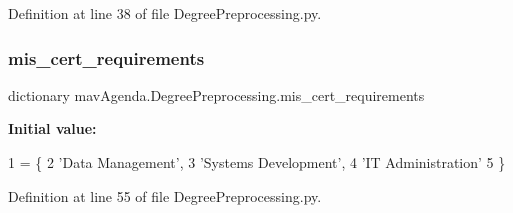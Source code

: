 Definition at line 38 of file Degree\+Preprocessing.\+py.

\mbox{\label{namespacemavAgenda_1_1DegreePreprocessing_a0dc9af5c79d9e5db222b8eb43ea009ce}} 
\subsubsection{\texorpdfstring{mis\+\_\+cert\+\_\+requirements}{mis\_cert\_requirements}}
{\footnotesize\ttfamily dictionary mav\+Agenda.\+Degree\+Preprocessing.\+mis\+\_\+cert\+\_\+requirements}

{\bfseries Initial value\+:}
\begin{DoxyCode}
1 =  \{
2     \textcolor{stringliteral}{'Data Management'},
3     \textcolor{stringliteral}{'Systems Development'},
4     \textcolor{stringliteral}{'IT Administration'}
5 \}
\end{DoxyCode}


Definition at line 55 of file Degree\+Preprocessing.\+py.

